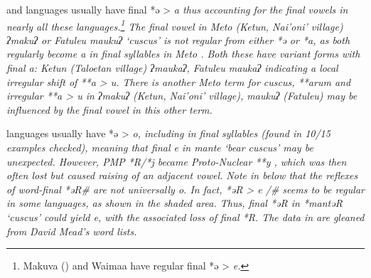and  languages usually have final *ə > \it{a}
thus accounting for the final vowels in nearly all these languages.\footnote{
Makuva
() and Waima{\Q}a have regular final *ə > \it{e}.}
The final vowel
in Meto (Ketun, Nai'oni' village) \it{ʔmakuʔ} or Fatule{\Q}u \it{maukuʔ} ‘cuscus’
is not regular from either *ə or *a,
as both regularly become \it{a} in final syllables in Meto \citep[55f, 73]{Edwards2021}.
Both these have variant forms with final \it{a:} Ketun (Taloetan
village) \it{ʔmaukaʔ,} Fatule{\Q}u \it{maukaʔ} indicating a local
irregular shift of **a \it{> u}.
There is another Meto term for cuscus,
**arum \citep[91f]{Edwards2021} and irregular **a > \it{u}
in \it{ʔmakuʔ} (Ketun, Nai'oni' village), \it{maukuʔ} (Fatule{\Q}u) may be influenced
by the final vowel in this other term.

 languages usually have *ə > \it{o},
including in final syllables (found in 10/15 examples checked),
meaning that final \it{e} in \it{mante} ‘bear cuscus’ may be unexpected.
However, PMP *R/*j became Proto-Nuclear  **y
\citep[91]{vandenBerg2003},
which was then often lost but caused raising of an adjacent vowel.
Note in  below that the reflexes of word-final *əR{\#} are not universally \it{o}.
In fact, *əR > \it{e} /{\gap}{\#} seems to be regular in some languages,
as shown in the shaded area.
Thus, final *əR in *mantəR ‘cuscus’ could yield \it{e},
with the associated loss of final *R.
The data in  are gleaned from David Mead’s word lists.

